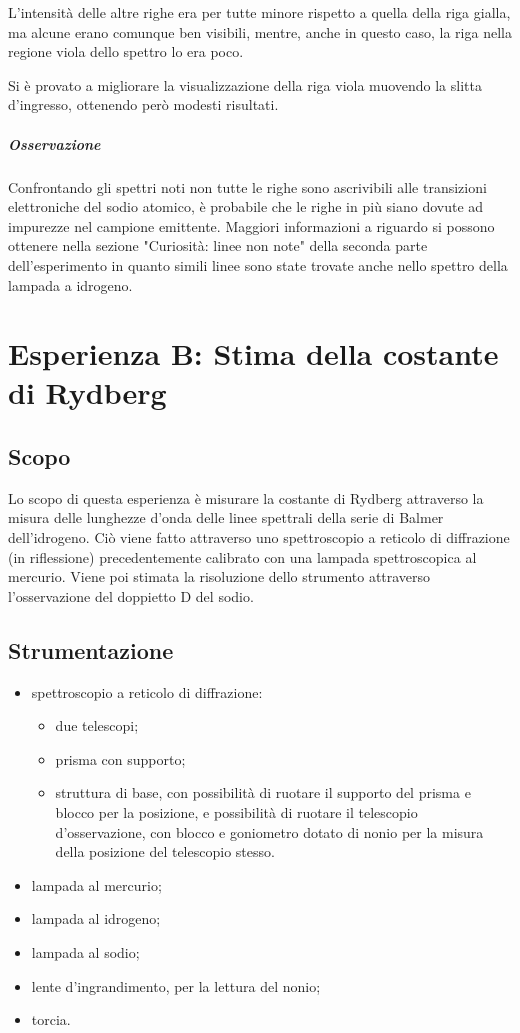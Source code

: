 \documentclass[a4paper,10pt]{article}
\begin{document}
{{{{{L'intensità delle altre righe era per tutte minore rispetto a quella della riga gialla, ma alcune erano comunque ben visibili, mentre, anche in questo caso, la riga nella regione viola dello spettro lo era poco.

Si è provato a migliorare la visualizzazione della riga viola muovendo la slitta d'ingresso, ottenendo però modesti risultati.

\subparagraph{Osservazione} Confrontando gli spettri noti non tutte le righe sono ascrivibili alle transizioni elettroniche del sodio atomico, è probabile che le righe in più siano dovute ad impurezze nel campione emittente. Maggiori informazioni a riguardo si possono ottenere nella sezione "Curiosità: linee non note" della seconda parte dell'esperimento in quanto simili linee sono state trovate anche nello spettro della lampada a idrogeno.


\section{Esperienza B: Stima della costante di Rydberg}
\subsection{Scopo}
Lo scopo di questa esperienza è misurare la costante di Rydberg attraverso la misura delle lunghezze d'onda delle linee spettrali della serie di Balmer dell'idrogeno. Ciò viene fatto attraverso uno spettroscopio a reticolo di diffrazione (in riflessione) precedentemente calibrato con una lampada spettroscopica al mercurio. Viene poi stimata la risoluzione dello strumento attraverso l'osservazione del doppietto D del sodio.
\subsection{Strumentazione}

\begin{itemize}
	\item spettroscopio a reticolo di diffrazione:
	\begin{itemize}
		\item due telescopi;
		\item prisma con supporto;
		\item struttura di base, con possibilità di ruotare il supporto del prisma e blocco per la posizione, e possibilità di ruotare il telescopio d'osservazione, con blocco e goniometro dotato di nonio per la misura della posizione del telescopio stesso.
	\end{itemize}
	\item lampada al mercurio;
	\item lampada al idrogeno;
	\item lampada al sodio;
	\item lente d'ingrandimento, per la lettura del nonio;
	\item torcia.
\end{itemize}

}}}}}
\end{document}
